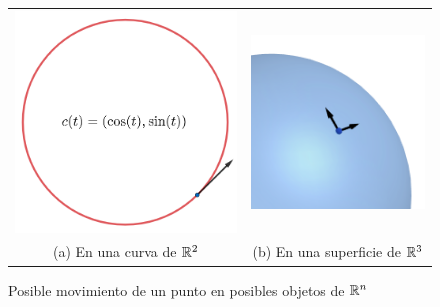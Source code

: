 \begin{figure}[ht]
\centering
\begin{tabular}{cc}
  \includegraphics[scale=0.3]{./img/circunferencia.png} &   \includegraphics[scale=0.5]{./img/esfera.png} \\
(a) En una curva de $\mathbb{R}^2$ & (b) En una superficie de $\mathbb{R}^3$ \\[4pt]
\end{tabular}
\caption{Posible movimiento de un punto en posibles objetos de $\mathbb{R}^n$}
\label{fig:curva-superficie}
\end{figure}

